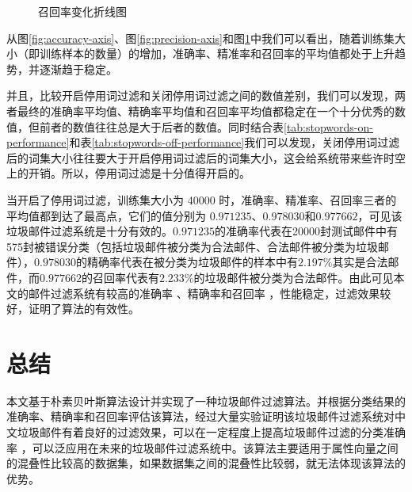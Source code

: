 \documentclass[UTF8,zihao=-4]{ctexart}
\begin{document}
	\begin{figure}[H]
	\centering
	\caption{召回率变化折线图}\label{fig:recall-axis}
\end{figure}

	从图\ref{fig:accuracy-axis}、图\ref{fig:precision-axis}和图\ref{fig:recall-axis}中我们可以看出，随着训练集大小（即训练样本的数量）的增加，准确率、精准率和召回率的平均值都处于上升趋势，并逐渐趋于稳定。
	
	并且，比较开启停用词过滤和关闭停用词过滤之间的数值差别，我们可以发现，两者最终的准确率平均值、精确率平均值和召回率平均值都稳定在一个十分优秀的数值，但前者的数值往往总是大于后者的数值。同时结合表\ref{tab:stopwords-on-performance}和表\ref{tab:stopwords-off-performance}我们可以发现，关闭停用词过滤后的词集大小往往要大于开启停用词过滤后的词集大小，这会给系统带来些许时空上的开销。所以，停用词过滤是十分值得开启的。
	
	当开启了停用词过滤，训练集大小为 40000 时，准确率、精准率、召回率三者的平均值都到达了最高点，它们的值分别为 $0.971235$、$0.978030$和$0.977662$，可见该垃圾邮件过滤系统是十分有效的。$0.971235$的准确率代表在20000封测试邮件中有575封被错误分类（包括垃圾邮件被分类为合法邮件、合法邮件被分类为垃圾邮件），$0.978030$的精确率代表在被分类为垃圾邮件的样本中有$2.197\%$其实是合法邮件，而$0.977662$的召回率代表有$2.233\%$的垃圾邮件被分类为合法邮件。由此可见本文的邮件过滤系统有较高的准确率 、精确率和召回率 ，性能稳定，过滤效果较好，证明了算法的有效性。

\newpage
\section*{总结}
	本文基于朴素贝叶斯算法设计并实现了一种垃圾邮件过滤算法。并根据分类结果的准确率、精确率和召回率评估该算法，经过大量实验证明该垃圾邮件过滤系统对中文垃圾邮件有着良好的过滤效果，可以在一定程度上提高垃圾邮件过滤的分类准确率
，可以泛应用在未来的垃圾邮件过滤系统中。该算法主要适用于属性向量之间的混叠性比较高的数据集，如果数据集之间的混叠性比较弱，就无法体现该算法的优势。
	
\end{document}
